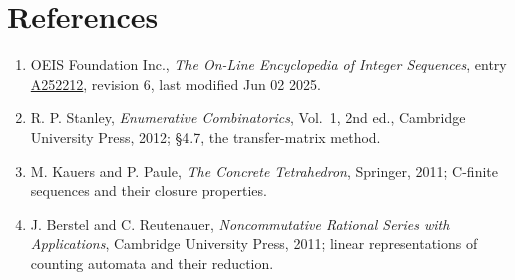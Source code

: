 \documentclass[11pt]{article}
\theoremstyle{definition}
\begin{document}
\section{References}

\begin{enumerate}

\item OEIS Foundation Inc., \emph{The On-Line Encyclopedia of Integer Sequences}, entry \href{https://oeis.org/A252212}{A252212}, revision 6, last modified Jun 02 2025.

\item R. P. Stanley, \emph{Enumerative Combinatorics}, Vol.~1, 2nd ed., Cambridge University Press, 2012; \S4.7, the transfer-matrix method.

\item M. Kauers and P. Paule, \emph{The Concrete Tetrahedron}, Springer, 2011; C-finite sequences and their closure properties.

\item J. Berstel and C. Reutenauer, \emph{Noncommutative Rational Series with Applications}, Cambridge University Press, 2011; linear representations of counting automata and their reduction.

\end{enumerate}
\end{document}
